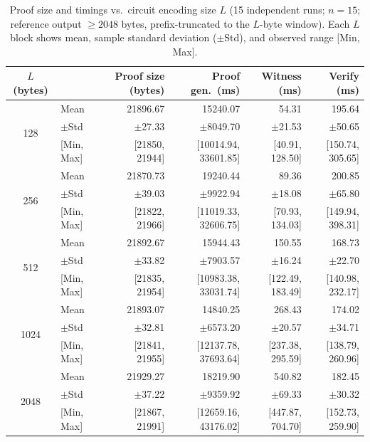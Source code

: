 \begin{table}[htbp]
\centering
\caption{Proof size and timings vs.\ circuit encoding size $L$ (15 independent runs; $n=15$; reference output $\ge 2048$ bytes, prefix-truncated to the $L$-byte window). Each $L$ block shows mean, sample standard deviation ($\pm$Std), and observed range [Min, Max].}
\label{tab:results}
\footnotesize
\setlength{\tabcolsep}{4pt}
\vspace{2ex}
\begin{tabular}{c l r r r r}
\hline
\hline
$L$ (bytes) & & Proof size (bytes) & Proof gen.\ (ms) & Witness (ms) & Verify (ms) \\
\hline
\multirow{3}{*}{128}
  & Mean      & 21896.67 & 15240.07 &  54.31 & 195.64 \\
  & $\pm$Std  & $\pm$27.33 & $\pm$8049.70 & $\pm$21.53 & $\pm$50.65 \\
  & {[Min, Max]} & {[21850, 21944]} & {[10014.94, 33601.85]} & {[40.91, 128.50]} & {[150.74, 305.65]} \\
\hline
\multirow{3}{*}{256}
  & Mean      & 21870.73 & 19240.44 &  89.36 & 200.85 \\
  & $\pm$Std  & $\pm$39.03 & $\pm$9922.94 & $\pm$18.08 & $\pm$65.80 \\
  & {[Min, Max]} & {[21822, 21966]} & {[11019.33, 32606.75]} & {[70.93, 134.03]} & {[149.94, 398.31]} \\
\hline
\multirow{3}{*}{512}
  & Mean      & 21892.67 & 15944.43 & 150.55 & 168.73 \\
  & $\pm$Std  & $\pm$33.82 & $\pm$7903.57 & $\pm$16.24 & $\pm$22.70 \\
  & {[Min, Max]} & {[21835, 21954]} & {[10983.38, 33031.74]} & {[122.49, 183.49]} & {[140.98, 232.17]} \\
\hline
\multirow{3}{*}{1024}
  & Mean      & 21893.07 & 14840.25 & 268.43 & 174.02 \\
  & $\pm$Std  & $\pm$32.81 & $\pm$6573.20 & $\pm$20.57 & $\pm$34.71 \\
  & {[Min, Max]} & {[21841, 21955]} & {[12137.78, 37693.64]} & {[237.38, 295.59]} & {[138.79, 260.96]} \\
\hline
\multirow{3}{*}{2048}
  & Mean      & 21929.27 & 18219.90 & 540.82 & 182.45 \\
  & $\pm$Std  & $\pm$37.22 & $\pm$9359.92 & $\pm$69.33 & $\pm$30.32 \\
  & {[Min, Max]} & {[21867, 21991]} & {[12659.16, 43176.02]} & {[447.87, 704.70]} & {[152.73, 259.90]} \\
\hline
\hline
\end{tabular}
\end{table}

